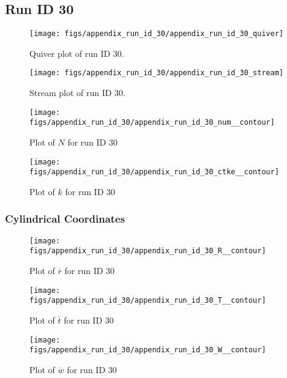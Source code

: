 \subsection{Run ID 30}
\begin{figure}[H]
\centering
\texttt{[image: figs/appendix\_run\_id\_30/appendix\_run\_id\_30\_quiver]}
\caption{Quiver plot of run ID 30.}
\label{fig:appendix_run_id_30_quiver}
\end{figure}


\begin{figure}[H]
\centering
\texttt{[image: figs/appendix\_run\_id\_30/appendix\_run\_id\_30\_stream]}
\caption{Stream plot of run ID 30.}
\label{fig:appendix_run_id_30_stream}
\end{figure}


\begin{figure}[H]
\centering
\texttt{[image: figs/appendix\_run\_id\_30/appendix\_run\_id\_30\_num\_\_contour]}
\caption{Plot of $N$ for run ID 30}
\label{fig:appendix_run_id_30_num__contour}
\end{figure}


\begin{figure}[H]
\centering
\texttt{[image: figs/appendix\_run\_id\_30/appendix\_run\_id\_30\_ctke\_\_contour]}
\caption{Plot of $k$ for run ID 30}
\label{fig:appendix_run_id_30_ctke__contour}
\end{figure}


\subsubsection{Cylindrical Coordinates}
\begin{figure}[H]
\centering
\texttt{[image: figs/appendix\_run\_id\_30/appendix\_run\_id\_30\_R\_\_contour]}
\caption{Plot of $\overline{r}$ for run ID 30}
\label{fig:appendix_run_id_30_R__contour}
\end{figure}


\begin{figure}[H]
\centering
\texttt{[image: figs/appendix\_run\_id\_30/appendix\_run\_id\_30\_T\_\_contour]}
\caption{Plot of $\overline{t}$ for run ID 30}
\label{fig:appendix_run_id_30_T__contour}
\end{figure}


\begin{figure}[H]
\centering
\texttt{[image: figs/appendix\_run\_id\_30/appendix\_run\_id\_30\_W\_\_contour]}
\caption{Plot of $\overline{w}$ for run ID 30}
\label{fig:appendix_run_id_30_W__contour}
\end{figure}


